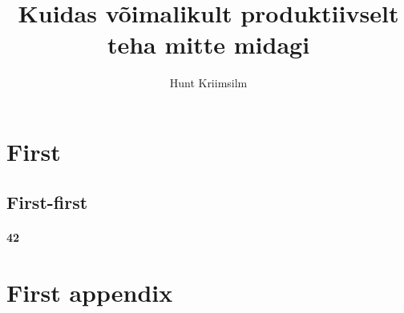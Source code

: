 \documentclass{trkuur}
\title{Kuidas võimalikult produktiivselt \\ teha mitte midagi}
\author{Hunt Kriimsilm}
\begin{document}
\maketitle
\tableofcontents


\chapter{First}

\section{First-first}
\autocite{wiki}

\subsubsection{42}

\printbibliography

\appendix
\chapter{First appendix}
\cite{wiki}
\end{document}

